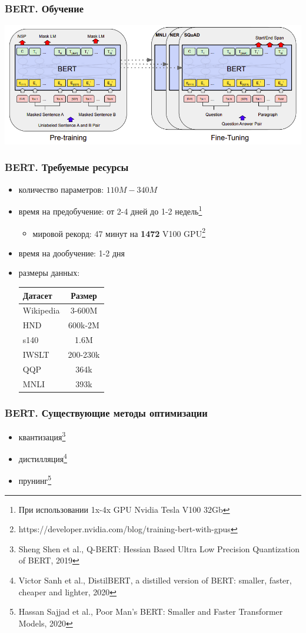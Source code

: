 \documentclass{beamer}
\begin{document}
\begin{frame}
	\frametitle{BERT. Обучение}
	\begin{center}
		\includegraphics[scale=0.35]{bert_train.png}
	\end{center}
\end{frame}

\begin{frame}
	\frametitle{BERT. Требуемые ресурсы}
	\begin{itemize}
		\item количество параметров: $110M - 340M$
		\item время на предобучение: от 2-4 дней до 1-2 недель\footnote[1]{При использовании 1x-4x GPU Nvidia Tesla V100 32Gb}
		\begin{itemize}
			\item мировой рекорд: 47 минут на {\bf 1472} V100 GPU\footnote[2]{https://developer.nvidia.com/blog/training-bert-with-gpus}
		\end{itemize}
		\item время на дообучение: 1-2 дня
		\item размеры данных:
			\begin{table}
				\begin{tabular}{l|c}
					Датасет & Размер \\
					\hline\hline
					Wikipedia & 3-600M \\
					HND & 600k-2M \\
					s140 & 1.6M \\
					IWSLT & 200-230k \\
					QQP & 364k \\
					MNLI & 393k \\
				\end{tabular}
			\end{table}
	\end{itemize}
\end{frame}

\begin{frame}
	\frametitle{BERT. Существующие методы оптимизации}
	\begin{itemize}
		\item квантизация\footnote[1]{Sheng Shen et al., Q-BERT: Hessian Based Ultra Low Precision Quantization of BERT, 2019}
		\item дистилляция\footnote[2]{Victor Sanh et al., DistilBERT, a distilled version of BERT: smaller, faster, cheaper and lighter, 2020}
		\item прунинг\footnote[3]{Hassan Sajjad et al., Poor Man’s BERT: Smaller and Faster Transformer Models, 2020}
	\end{itemize}
\end{frame}
\end{document}

